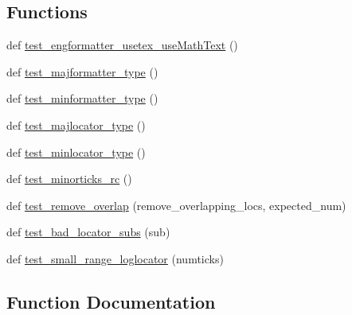 \subsection*{Functions}
\begin{DoxyCompactItemize}
\item 
def \hyperlink{namespacematplotlib_1_1tests_1_1test__ticker_adc571665f021a614e11cab74d3a6da37}{test\+\_\+engformatter\+\_\+usetex\+\_\+use\+Math\+Text} ()
\item 
def \hyperlink{namespacematplotlib_1_1tests_1_1test__ticker_a2c6c4e19b90828c72c8325bd25854f72}{test\+\_\+majformatter\+\_\+type} ()
\item 
def \hyperlink{namespacematplotlib_1_1tests_1_1test__ticker_abc5a2f71786ee517ca2ea955e09a5603}{test\+\_\+minformatter\+\_\+type} ()
\item 
def \hyperlink{namespacematplotlib_1_1tests_1_1test__ticker_a8f7529fd0404504620cb0e3d626dcf04}{test\+\_\+majlocator\+\_\+type} ()
\item 
def \hyperlink{namespacematplotlib_1_1tests_1_1test__ticker_a9b2d028c5f87d065e544ded171f4f9da}{test\+\_\+minlocator\+\_\+type} ()
\item 
def \hyperlink{namespacematplotlib_1_1tests_1_1test__ticker_aa58a87c80ecee6fbcb2ba5b5996b550a}{test\+\_\+minorticks\+\_\+rc} ()
\item 
def \hyperlink{namespacematplotlib_1_1tests_1_1test__ticker_a590f5a76b2bd3a5281a4715570b1d13a}{test\+\_\+remove\+\_\+overlap} (remove\+\_\+overlapping\+\_\+locs, expected\+\_\+num)
\item 
def \hyperlink{namespacematplotlib_1_1tests_1_1test__ticker_aab3eb99efe965692957bd27272193bb0}{test\+\_\+bad\+\_\+locator\+\_\+subs} (sub)
\item 
def \hyperlink{namespacematplotlib_1_1tests_1_1test__ticker_a5bea5ec5f515cbba6f1cb4cc7658a6c5}{test\+\_\+small\+\_\+range\+\_\+loglocator} (numticks)
\end{DoxyCompactItemize}


\subsection{Function Documentation}
\mbox{\label{namespacematplotlib_1_1tests_1_1test__ticker_aab3eb99efe965692957bd27272193bb0}} 
